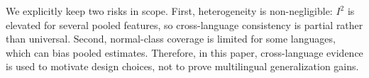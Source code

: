 We explicitly keep two risks in scope. First, heterogeneity is non-negligible: $I^2$ is elevated for several pooled features, so cross-language consistency is partial rather than universal. Second, normal-class coverage is limited for some languages, which can bias pooled estimates. Therefore, in this paper, cross-language evidence is used to motivate design choices, not to prove multilingual generalization gains.
